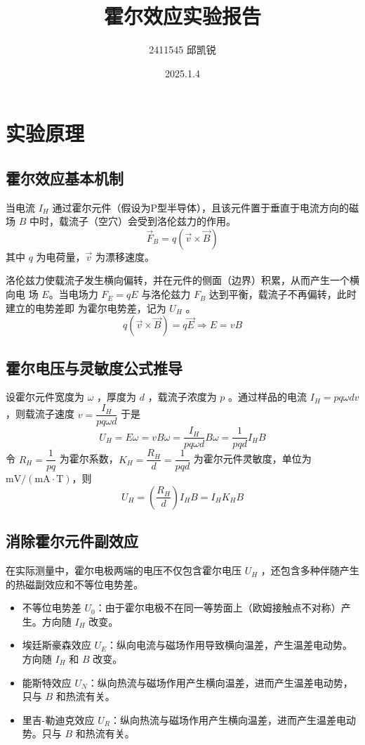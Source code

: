\documentclass[12pt]{article}
\title{霍尔效应实验报告}
\author{2411545 邱凯锐}
\date{2025.1.4}
\begin{document}
\maketitle
\section{实验原理}
\subsection{霍尔效应基本机制}
当电流 $I_H$ 通过霍尔元件（假设为P型半导体），且该元件置于垂直于电流方向的磁场 $B$
中时，载流子（空穴）会受到洛伦兹力的作用。
\begin{equation}
    \vec F_B=q(\vec v\times \vec B)
\end{equation}
其中 $q$ 为电荷量，$\vec v$ 为漂移速度。

洛伦兹力使载流子发生横向偏转，并在元件的侧面（边界）积累，从而产生一个横向电
场 $E$。当电场力 $F_E=q E$ 与洛伦兹力 $F_B$ 达到平衡，载流子不再偏转，此时建立的电势差即
为霍尔电势差，记为 $U_H$ 。
\begin{equation}
    q(\vec v\times \vec B)=q\vec E \Rightarrow E=vB
\end{equation}

\subsection{霍尔电压与灵敏度公式推导}
设霍尔元件宽度为 $\omega$ ，厚度为 $d$ ，载流子浓度为 $p$ 。通过样品的电流 $I_H=pq\omega dv$，则载流子速度 $v=\dfrac{I_H}{pq\omega d}$
于是
\begin{equation}
    U_H=E\omega=vB\omega =\frac{I_H}{pq\omega d}B\omega =\frac 1{pqd}I_HB
\end{equation}
令 $R_H=\dfrac{1}{pq}$ 为霍尔系数，$K_H=\dfrac{R_H}{d}=\dfrac{1}{pqd}$ 为霍尔元件灵敏度，单位为 $\mathrm{mV/(mA\cdot T)}$，则
\begin{equation}
    U_H=\left(\frac{R_H}{d}\right)I_HB=I_H K_HB
\end{equation}

\subsection{消除霍尔元件副效应}
在实际测量中，霍尔电极两端的电压不仅包含霍尔电压 $U_H$ ，还包含多种伴随产生的热磁副效应和不等位电势差。
\begin{itemize}
    \item 不等位电势差 $U_0$：由于霍尔电极不在同一等势面上（欧姆接触点不对称）产生。方向随 $I_H$ 改变。
    \item 埃廷斯豪森效应 $U_E$：纵向电流与磁场作用导致横向温差，产生温差电动势。方向随 $I_H$ 和 $B$ 改变。
    \item 能斯特效应 $U_N$：纵向热流与磁场作用产生横向温差，进而产生温差电动势，只与 $B$ 和热流有关。
    \item 里吉-勒迪克效应 $U_R$：纵向热流与磁场作用产生横向温差，进而产生温差电动势。只与 $B$ 和热流有关。
\end{itemize}
\end{document}
